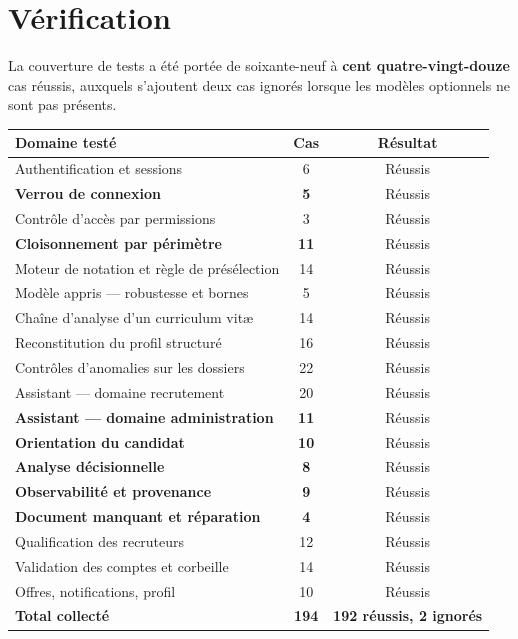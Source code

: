 \documentclass[11pt,a4paper]{article}
\begin{document}
\section{Vérification}
La couverture de tests a été portée de soixante-neuf à \textbf{cent quatre-vingt-douze} cas réussis, auxquels s'ajoutent deux cas ignorés lorsque les modèles optionnels ne sont pas présents.

\begin{center}
\small
\begin{tabular}{lcc}
  \toprule
  \textbf{Domaine testé} & \textbf{Cas} & \textbf{Résultat} \\
  \midrule
  Authentification et sessions & 6 & \textcolor{vert}{Réussis} \\
  \textbf{Verrou de connexion} & \textbf{5} & \textcolor{vert}{Réussis} \\
  Contrôle d'accès par permissions & 3 & \textcolor{vert}{Réussis} \\
  \textbf{Cloisonnement par périmètre} & \textbf{11} & \textcolor{vert}{Réussis} \\
  Moteur de notation et règle de présélection & 14 & \textcolor{vert}{Réussis} \\
  Modèle appris --- robustesse et bornes & 5 & \textcolor{vert}{Réussis} \\
  Chaîne d'analyse d'un curriculum vitæ & 14 & \textcolor{vert}{Réussis} \\
  Reconstitution du profil structuré & 16 & \textcolor{vert}{Réussis} \\
  Contrôles d'anomalies sur les dossiers & 22 & \textcolor{vert}{Réussis} \\
  Assistant --- domaine recrutement & 20 & \textcolor{vert}{Réussis} \\
  \textbf{Assistant --- domaine administration} & \textbf{11} & \textcolor{vert}{Réussis} \\
  \textbf{Orientation du candidat} & \textbf{10} & \textcolor{vert}{Réussis} \\
  \textbf{Analyse décisionnelle} & \textbf{8} & \textcolor{vert}{Réussis} \\
  \textbf{Observabilité et provenance} & \textbf{9} & \textcolor{vert}{Réussis} \\
  \textbf{Document manquant et réparation} & \textbf{4} & \textcolor{vert}{Réussis} \\
  Qualification des recruteurs & 12 & \textcolor{vert}{Réussis} \\
  Validation des comptes et corbeille & 14 & \textcolor{vert}{Réussis} \\
  Offres, notifications, profil & 10 & \textcolor{vert}{Réussis} \\
  \midrule
  \textbf{Total collecté} & \textbf{194} & \textcolor{vert}{\textbf{192 réussis, 2 ignorés}} \\
  \bottomrule
\end{tabular}
\end{center}
\end{document}

